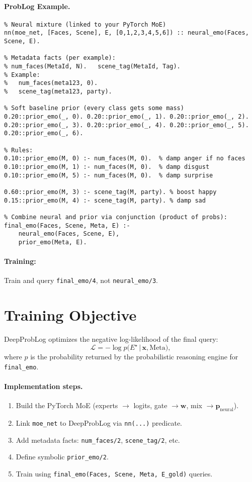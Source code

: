 \documentclass[12pt]{article}
\begin{document}
\paragraph{ProbLog Example.}
\begin{lstlisting}
% Neural mixture (linked to your PyTorch MoE)
nn(moe_net, [Faces, Scene], E, [0,1,2,3,4,5,6]) :: neural_emo(Faces, Scene, E).

% Metadata facts (per example):
% num_faces(MetaId, N).   scene_tag(MetaId, Tag).
% Example:
%   num_faces(meta123, 0).
%   scene_tag(meta123, party).

% Soft baseline prior (every class gets some mass)
0.20::prior_emo(_, 0). 0.20::prior_emo(_, 1). 0.20::prior_emo(_, 2).
0.20::prior_emo(_, 3). 0.20::prior_emo(_, 4). 0.20::prior_emo(_, 5).
0.20::prior_emo(_, 6).

% Rules:
0.10::prior_emo(M, 0) :- num_faces(M, 0).  % damp anger if no faces
0.10::prior_emo(M, 1) :- num_faces(M, 0).  % damp disgust
0.10::prior_emo(M, 5) :- num_faces(M, 0).  % damp surprise

0.60::prior_emo(M, 3) :- scene_tag(M, party). % boost happy
0.15::prior_emo(M, 4) :- scene_tag(M, party). % damp sad

% Combine neural and prior via conjunction (product of probs):
final_emo(Faces, Scene, Meta, E) :-
    neural_emo(Faces, Scene, E),
    prior_emo(Meta, E).
\end{lstlisting}

\paragraph{Training:} Train and query \texttt{final\_emo/4}, not \texttt{neural\_emo/3}.

\section{Training Objective}
DeepProbLog optimizes the negative log-likelihood of the final query:
\[
\mathcal{L} = - \log p\bigl(E^{\star}\,\big|\,\bm{x},\text{Meta}\bigr),
\]
where $p$ is the probability returned by the probabilistic reasoning engine for \texttt{final\_emo}.

\paragraph{Implementation steps.}
\begin{enumerate}[leftmargin=1.2em]
  \item Build the PyTorch MoE (experts $\to$ logits, gate $\to \bm{w}$, mix $\to \bm{p}_{\text{neural}}$).
  \item Link \texttt{moe\_net} to DeepProbLog via \texttt{nn(...)} predicate.
  \item Add metadata facts: \texttt{num\_faces/2}, \texttt{scene\_tag/2}, etc.
  \item Define symbolic \texttt{prior\_emo/2}.
  \item Train using \texttt{final\_emo(Faces, Scene, Meta, E\_gold)} queries.
\end{enumerate}
\end{document}
